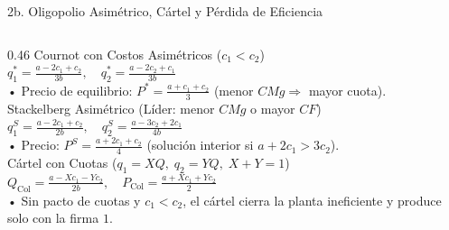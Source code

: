 \documentclass[aspectratio=169, 10pt]{beamer}
\begin{document}
\begin{frame}{2b. Oligopolio Asimétrico, Cártel y Pérdida de Eficiencia}
\begin{columns}[T]
    \begin{column}{0.46\textwidth}
      {\scriptsize\color{grisTexto}Cournot con Costos Asimétricos (\(c_1 < c_2\))}\\[1pt]
      {\small\color{azulPrincipal}\textbf{\(q_1^* = \frac{a-2c_1+c_2}{3b},\quad q_2^* = \frac{a-2c_2+c_1}{3b}\)}}\\[1pt]
      {\scriptsize
        • Precio de equilibrio: \(P^* = \frac{a + c_1 + c_2}{3}\) (menor \(CMg \Rightarrow\) mayor cuota).\\[3pt]
      }
      {\scriptsize\color{grisTexto}Stackelberg Asimétrico (Líder: menor \(CMg\) o mayor \(CF\))}\\[1pt]
      {\small\color{naranjaAcento}\textbf{\(q_1^S = \frac{a-2c_1+c_2}{2b},\quad q_2^S = \frac{a-3c_2+2c_1}{4b}\)}}\\[1pt]
      {\scriptsize
        • Precio: \(P^S = \frac{a + 2c_1 + c_2}{4}\) (solución interior si \(a+2c_1 > 3c_2\)).\\[3pt]
      }
      {\scriptsize\color{grisTexto}Cártel con Cuotas (\(q_1 = XQ,\; q_2 = YQ,\; X+Y=1\))}\\[1pt]
      {\small\color{rojoAcento}\textbf{\(Q_{\text{Col}} = \frac{a - Xc_1 - Yc_2}{2b},\quad P_{\text{Col}} = \frac{a + Xc_1 + Yc_2}{2}\)}}\\[1pt]
      {\scriptsize
        • Sin pacto de cuotas y \(c_1 < c_2\), el cártel cierra la planta ineficiente y produce solo con la firma \(1\).
      }
    \end{column}
  \end{columns}

\end{frame}
\end{document}
